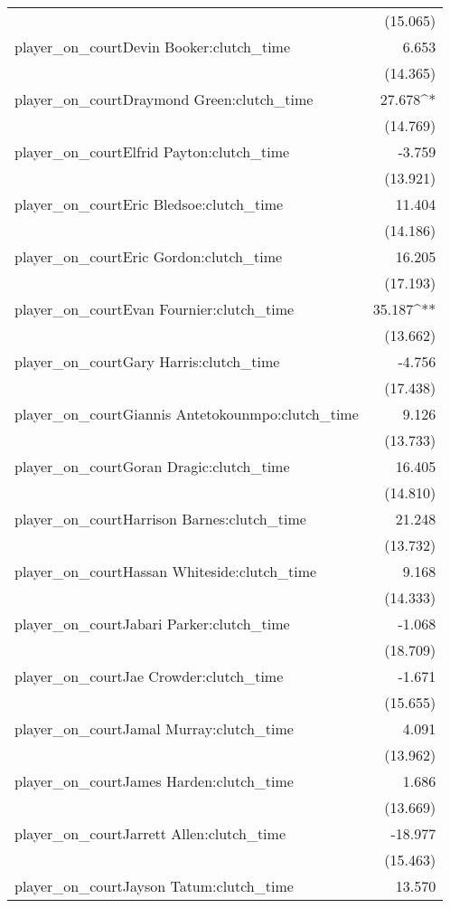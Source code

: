 \documentclass[
  landscape]{article}
\begin{document}
\begin{table}[!htbp]
\begin{tabular}{@{\extracolsep{5pt}}lD{.}{.}{-3} }
  & (15.065) \\ 
  player\_on\_courtDevin Booker:clutch\_time & 6.653 \\ 
  & (14.365) \\ 
  player\_on\_courtDraymond Green:clutch\_time & 27.678^{*} \\ 
  & (14.769) \\ 
  player\_on\_courtElfrid Payton:clutch\_time & -3.759 \\ 
  & (13.921) \\ 
  player\_on\_courtEric Bledsoe:clutch\_time & 11.404 \\ 
  & (14.186) \\ 
  player\_on\_courtEric Gordon:clutch\_time & 16.205 \\ 
  & (17.193) \\ 
  player\_on\_courtEvan Fournier:clutch\_time & 35.187^{**} \\ 
  & (13.662) \\ 
  player\_on\_courtGary Harris:clutch\_time & -4.756 \\ 
  & (17.438) \\ 
  player\_on\_courtGiannis Antetokounmpo:clutch\_time & 9.126 \\ 
  & (13.733) \\ 
  player\_on\_courtGoran Dragic:clutch\_time & 16.405 \\ 
  & (14.810) \\ 
  player\_on\_courtHarrison Barnes:clutch\_time & 21.248 \\ 
  & (13.732) \\ 
  player\_on\_courtHassan Whiteside:clutch\_time & 9.168 \\ 
  & (14.333) \\ 
  player\_on\_courtJabari Parker:clutch\_time & -1.068 \\ 
  & (18.709) \\ 
  player\_on\_courtJae Crowder:clutch\_time & -1.671 \\ 
  & (15.655) \\ 
  player\_on\_courtJamal Murray:clutch\_time & 4.091 \\ 
  & (13.962) \\ 
  player\_on\_courtJames Harden:clutch\_time & 1.686 \\ 
  & (13.669) \\ 
  player\_on\_courtJarrett Allen:clutch\_time & -18.977 \\ 
  & (15.463) \\ 
  player\_on\_courtJayson Tatum:clutch\_time & 13.570 \\ 

\end{tabular}
\end{table}
\end{document}
